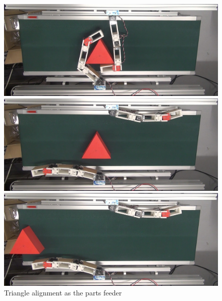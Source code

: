 \documentclass[a4paper,twoside,12pt,papersize, dvipdfmx]{iirthesis}
\begin{document}
\begin{figure}[hb]
\begin{minipage}{0.49\hsize}
\includegraphics[width=0.98\hsize]{fig/4-manipulation-result/Triangle/3-4.jpg}
\subcaption{}
\end{minipage}\hfill
\begin{minipage}{0.49\hsize}
\includegraphics[width=0.98\hsize]{fig/4-manipulation-result/Triangle/3-5.jpg}
\subcaption{}
\end{minipage}\hfill
\begin{minipage}{0.49\hsize}
\includegraphics[width=0.98\hsize]{fig/4-manipulation-result/Triangle/3-6.jpg}
\subcaption{}
\end{minipage}\hfill
\caption{Triangle alignment as the parts feeder}\label{fig::result::trip}
\end{figure}
\end{document}
